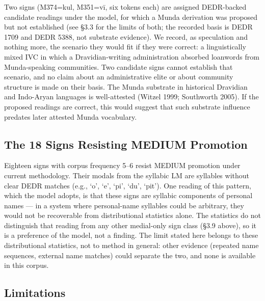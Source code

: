 \documentclass[11pt]{article}
\newcounter{none} %
\begin{document}
Two signs (M374=kul, M351=vī, six tokens each) are assigned DEDR-backed candidate readings under the model, for which a Munda derivation was proposed but not established (see §3.3 for the limits of both; the recorded basis is DEDR 1709 and DEDR 5388, not substrate evidence). We record, as speculation and nothing more, the scenario they would fit if they were correct: a linguistically mixed IVC in which a Dravidian-writing administration absorbed loanwords from Munda-speaking communities. Two candidate signs cannot establish that scenario, and no claim about an administrative elite or about community structure is made on their basis. The Munda substrate in historical
Dravidian and Indo-Aryan languages is well-attested (Witzel 1999;
Southworth 2005). If the proposed readings are correct, this would suggest that such substrate influence predates later attested Munda vocabulary.

\subsection{The 18 Signs Resisting MEDIUM Promotion}\label{the-18-signs-resisting-medium}

Eighteen signs with corpus frequency 5--6 resist MEDIUM promotion under current methodology. Their modals
from the syllabic LM are syllables without clear DEDR matches (e.g.,
`o', `e', `pi', `du', `pit'). One reading of this pattern, which the model adopts, is that these signs are syllabic components of personal names --- in a system where personal-name syllables could be arbitrary, they would not be recoverable from distributional statistics alone. The statistics do not distinguish that reading from any other medial-only sign class (§3.9 above), so it is a preference of the model, not a finding. The limit stated here belongs to these distributional statistics, not to method in general: other evidence (repeated name sequences, external name matches) could separate the two, and none is available in this corpus.

\subsection{Limitations}\label{limitations}
\end{document}
